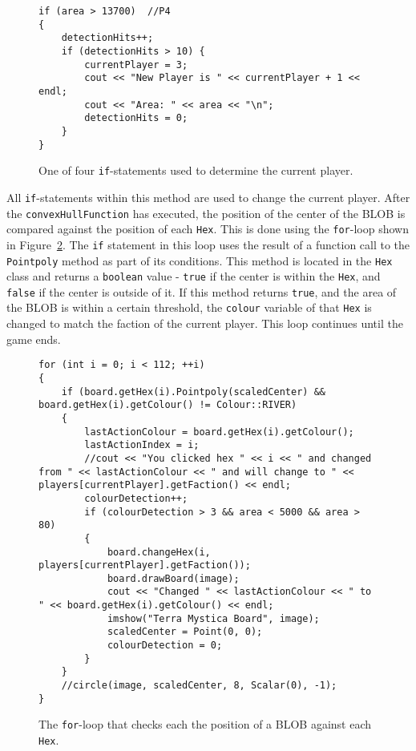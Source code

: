 \begin{figure}[!h]
\begin{lstlisting}
if (area > 13700)  //P4
{
	detectionHits++;
	if (detectionHits > 10) {
		currentPlayer = 3;
		cout << "New Player is " << currentPlayer + 1 << endl;
		cout << "Area: " << area << "\n";
		detectionHits = 0;
	}
}
\end{lstlisting}
\caption{One of four \texttt{if}-statements used to determine the current player. \label{fig:currentPlayerIf}}
\end{figure}

All \texttt{if}-statements within this method are used to change the current player. After the \texttt{convexHullFunction} has executed, the position of the center of the BLOB is compared against the position of each \texttt{Hex}. This is done using the \texttt{for}-loop shown in Figure~\ref{fig:changeHexForLoop}. The \texttt{if} statement in this loop uses the result of a function call to the \texttt{Pointpoly} method as part of its conditions. This method is located in the \texttt{Hex} class and returns a \texttt{boolean} value - \texttt{true} if the center is within the \texttt{Hex}, and \texttt{false} if the center is outside of it. If this method returns \texttt{true}, and the area of the BLOB is within a certain threshold, the \texttt{colour} variable of that \texttt{Hex} is changed to match the faction of the current player. This loop continues until the game ends.

\begin{figure}[!h]
\begin{lstlisting}
for (int i = 0; i < 112; ++i)
{
	if (board.getHex(i).Pointpoly(scaledCenter) && board.getHex(i).getColour() != Colour::RIVER)  
	{
		lastActionColour = board.getHex(i).getColour();
		lastActionIndex = i;
		//cout << "You clicked hex " << i << " and changed from " << lastActionColour << " and will change to " << players[currentPlayer].getFaction() << endl;
		colourDetection++;
		if (colourDetection > 3 && area < 5000 && area > 80) 
		{
			board.changeHex(i, players[currentPlayer].getFaction());
			board.drawBoard(image);
			cout << "Changed " << lastActionColour << " to " << board.getHex(i).getColour() << endl;
			imshow("Terra Mystica Board", image);
			scaledCenter = Point(0, 0);
			colourDetection = 0;
		}
	}
	//circle(image, scaledCenter, 8, Scalar(0), -1);
}
\end{lstlisting}
\caption{The \texttt{for}-loop that checks each the position of a BLOB against each \texttt{Hex}. \label{fig:changeHexForLoop}}
\end{figure}


